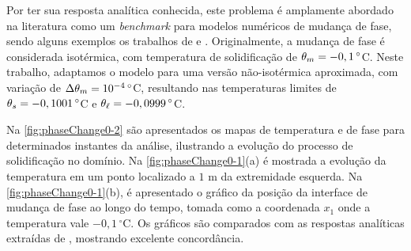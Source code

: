 \documentclass[Tese.tex]{subfiles}
\begin{document}
Por ter sua resposta analítica conhecida, este problema é amplamente abordado na literatura como um \emph{benchmark} para modelos numéricos de mudança de fase, sendo alguns exemplos os trabalhos de  e . Originalmente, a mudança de fase é considerada isotérmica, com temperatura de solidificação de $\theta_m = -0,1\,^{\circ}$C. Neste trabalho, adaptamos o modelo para uma versão não-isotérmica aproximada, com variação de $\Delta\theta_m = 10^{-4}\,^{\circ}$C, resultando nas temperaturas limites de $\theta_s = -0,1001\,^{\circ}$C e $\theta_\ell = -0,0999\,^{\circ}$C.

Na \cref{fig:phaseChange0-2} são apresentados os mapas de temperatura e de fase para determinados instantes da análise, ilustrando a evolução do processo de solidificação no domínio. Na \cref{fig:phaseChange0-1}(a) é mostrada a evolução da temperatura em um ponto localizado a $1$ m da extremidade esquerda. Na \cref{fig:phaseChange0-1}(b), é apresentado o gráfico da posição da interface de mudança de fase ao longo do tempo, tomada como a coordenada $x_1$ onde a temperatura vale $-0,1\,^{\circ}$C. Os gráficos são comparados com as respostas analíticas extraídas de , mostrando excelente concordância.
\end{document}
